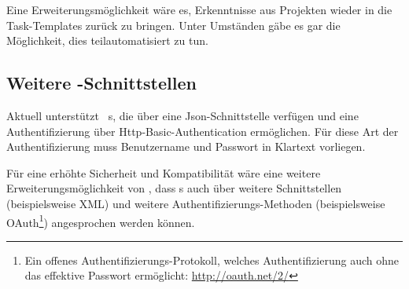 			Eine Erweiterungsmöglichkeit wäre es,
			Erkenntnisse aus Projekten wieder in die Task-Templates zurück zu bringen.
			Unter Umständen gäbe es gar die Möglichkeit, dies teilautomatisiert zu tun.

		\subsection{Weitere \ppt-Schnittstellen}
		\label{subsec:morePPTInterfaces}
			Aktuell unterstützt \eeppi\ \ppt s, die über eine Json-Schnittstelle verfügen
			und eine Authentifizierung über Http-Basic-Authentication ermöglichen.
			Für diese Art der Authentifizierung muss Benutzername und Passwort in Klartext vorliegen.
			
			Für eine erhöhte Sicherheit und Kompatibilität wäre eine weitere Erweiterungsmöglichkeit von \eeppi,
			dass \ppt s auch über weitere Schnittstellen (beispielsweise XML)
			und weitere Authentifizierungs-Methoden (beispielsweise OAuth\footnote{Ein offenes Authentifizierungs-Protokoll, welches Authentifizierung auch ohne das effektive Passwort ermöglicht: \url{http://oauth.net/2/}}) angesprochen werden können.
			
